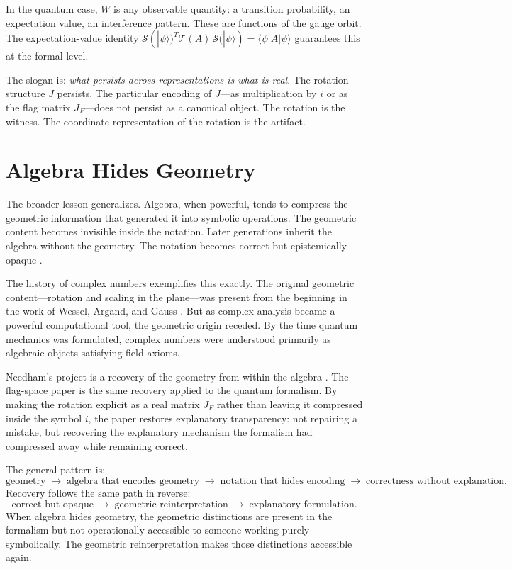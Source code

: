 \documentclass[12pt]{article}
\begin{document}
In the quantum case, $W$ is any observable quantity: a transition probability, an expectation value, an interference pattern. These are functions of the gauge orbit. The expectation-value identity $\mathcal{S}(|\psi\rangle)^T \mathcal{T}(A)\,\mathcal{S}(|\psi\rangle) = \langle\psi|A|\psi\rangle$ \cite{Barrios} guarantees this at the formal level.

The slogan is: \emph{what persists across representations is what is real}. The rotation structure $J$ persists. The particular encoding of $J$---as multiplication by $i$ or as the flag matrix $J_F$---does not persist as a canonical object. The rotation is the witness. The coordinate representation of the rotation is the artifact.

\section{Algebra Hides Geometry}

The broader lesson generalizes. Algebra, when powerful, tends to compress the geometric information that generated it into symbolic operations. The geometric content becomes invisible inside the notation. Later generations inherit the algebra without the geometry. The notation becomes correct but epistemically opaque \cite{Penrose,Weyl}.

The history of complex numbers exemplifies this exactly. The original geometric content---rotation and scaling in the plane---was present from the beginning in the work of Wessel, Argand, and Gauss \cite{Wessel,Argand,Gauss}. But as complex analysis became a powerful computational tool, the geometric origin receded. By the time quantum mechanics was formulated, complex numbers were understood primarily as algebraic objects satisfying field axioms.

Needham's project is a recovery of the geometry from within the algebra \cite{Needham}. The flag-space paper is the same recovery applied to the quantum formalism. By making the rotation explicit as a real matrix $J_F$ rather than leaving it compressed inside the symbol $i$, the paper restores explanatory transparency: not repairing a mistake, but recovering the explanatory mechanism the formalism had compressed away while remaining correct.

The general pattern is:
\[
\text{geometry}
\;\longrightarrow\;
\text{algebra that encodes geometry}
\;\longrightarrow\;
\text{notation that hides encoding}
\;\longrightarrow\;
\text{correctness without explanation.}
\]
Recovery follows the same path in reverse:
\[
\text{correct but opaque}
\;\longrightarrow\;
\text{geometric reinterpretation}
\;\longrightarrow\;
\text{explanatory formulation.}
\]
When algebra hides geometry, the geometric distinctions are present in the formalism but not operationally accessible to someone working purely symbolically. The geometric reinterpretation makes those distinctions accessible again.
\end{document}
